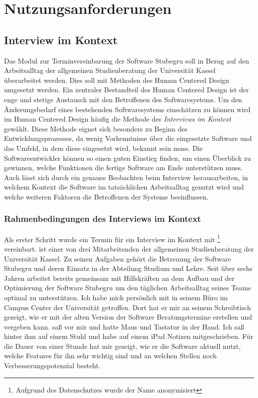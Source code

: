 \chapter{Nutzungsanforderungen}
\label{chapter:user-requirements}

\section{Interview im Kontext}
\label{subsection:IIK}

Das Modul zur Terminvereinbarung der Software Stubegru soll in Bezug auf den
Arbeitsalltag der allgemeinen Studienberatung der Universität Kassel
überarbeitet werden. Dies soll mit Methoden des Human Centered Design umgesetzt
werden. Ein zentraler Bestandteil des Human Centered Design ist der enge und
stetige Austausch mit den Betroffenen des Softwaresystems\cite{hci}. Um den
Änderungsbedarf eines bestehenden Softwaresystems einschätzen zu können wird im
Human Centered Design häufig die Methode des \textit{Interviews im Kontext}
gewählt\cite{contextualDesign}. Diese Methode eignet sich besonders zu Beginn
des Entwicklungsprozesses, da wenig Vorkenntnisse über die eingesetzte Software
und das Umfeld, in dem diese eingesetzt wird, bekannt sein muss. Die
Softwareentwickler können so einen guten Einstieg finden, um einen Überblick zu
gewinnen, welche Funktionen die fertige Software am Ende unterstützen muss.
Auch lässt sich durch ein genaues Beobachten beim Interview herausarbeiten, in
welchem Kontext die Software im tatsächlichen Arbeitsalltag genutzt wird und
welche weiteren Faktoren die Betroffenen der Systeme beeinflussen.

\subsection*{Rahmenbedingungen des Interviews im Kontext}
Als erster Schritt wurde ein Termin für ein Interview im Kontext mit
\ipName\footnote{Aufgrund des Datenschutzes wurde der Name anonymisiert}
vereinbart. \ipName ist einer von drei Mitarbeitenden der allgemeinen
Studienberatung der Universität Kassel. Zu seinen Aufgaben gehört die Betreuung
der Software Stubegru und deren Einsatz in der Abteilung Studium und Lehre.
Seit über sechs Jahren arbeitet \ipName bereits gemeinsam mit Hilfskräften an
dem Aufbau und der Optimierung der Software Stubegru um den täglichen
Arbeitsalltag seines Teams optimal zu unterstützen. Ich habe mich persönlich
mit \ipName in seinem Büro im Campus Center der Universität getroffen. Dort hat
er mir an seinem Schreibtisch gezeigt, wie er mit der alten Version der
Software Beratungstermine erstellen und vergeben kann. \ipName saß vor mir und
hatte Maus und Tastatur in der Hand. Ich saß hinter ihm auf einem Stuhl und
habe auf einem iPad Notizen mitgeschrieben. Für die Dauer von einer Stunde hat
\ipName mir gezeigt, wie er die Software aktuell nutzt, welche Features für ihn
sehr wichtig sind und an welchen Stellen noch Verbesserungspotenzial besteht.

